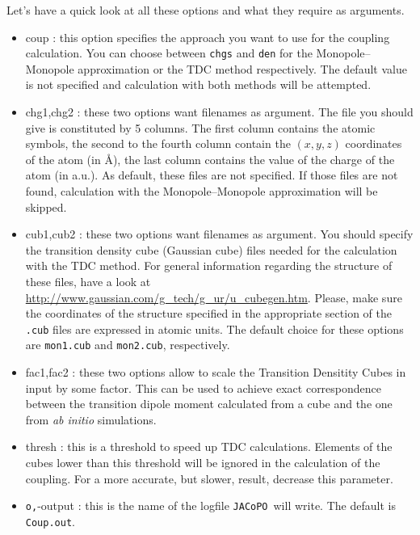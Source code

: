 \documentclass[a4paper]{article}
\newcommand{\jacopo}{\texttt{JACoPO}}
\begin{document}
Let's have a quick look at all these options and what they require as arguments.

\begin{itemize}

 \item \verb --coup : this option specifies the approach you want to use for the coupling calculation. You can choose between \verb|chgs| and \verb|den| for the Monopole--Monopole approximation or the TDC method respectively. The default value is not specified and calculation with both methods will be attempted.
 
 \item \verb --chg1,chg2 : these two options want filenames as argument. The file you should give is constituted by 5 columns. The first column contains the atomic symbols, the second to the fourth column contain the $(x, y, z)$ coordinates of the atom (in \AA{}), the last column contains the value of the charge of the atom (in a.u.). As default, these files are not specified. If those files are not found, calculation with the Monopole--Monopole approximation will be skipped.
 
 \item \verb --cub1,cub2 : these two options want filenames as argument. You should specify the transition density cube (Gaussian cube) files needed for the calculation with the TDC method. For general information regarding the structure of these files, have a look at \url{http://www.gaussian.com/g_tech/g_ur/u_cubegen.htm}. Please, make sure the coordinates of the structure specified in the appropriate section of the \verb|.cub| files are expressed in atomic units. The default choice for these options are \verb|mon1.cub| and \verb|mon2.cub|, respectively.

 \item \verb --fac1,fac2 : these two options allow to scale the Transition Densitity Cubes in input by some factor. This can be used to achieve exact correspondence between the transition dipole moment calculated from a cube and the one from \textit{ab initio} simulations.\footnotemark


 \item \verb --thresh : this is a threshold to speed up TDC calculations. Elements of the cubes lower than this threshold will be ignored in the calculation of the coupling. For a more accurate, but slower, result, decrease this parameter.
 
 \item \verb -o,--output : this is the name of the logfile \jacopo\ will write. The default is \verb|Coup.out|.
 
\end{itemize}
\end{document}
